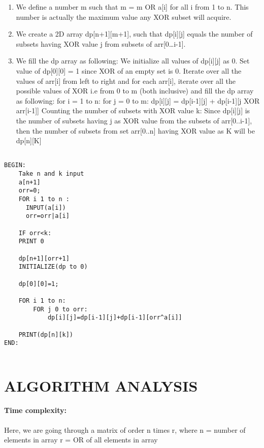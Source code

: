 \documentclass[10pt]{article}
\begin{document}
\begin{multicols*}{2}
\begin{enumerate}
\item	We define a number m such that m = m OR a[i] for all i from 1 to n. This number is actually the maximum value any XOR subset will acquire.

\item	 We create a 2D array dp[n+1][m+1], such that dp[i][j] equals the number of subsets having XOR value j from subsets of arr[0…i-1].

\item	We fill the dp array as following:
We initialize all values of dp[i][j] as 0.
Set value of dp[0][0] = 1 since XOR of an empty set is 0.
Iterate over all the values of arr[i] from left to right and for each arr[i], iterate over all the possible values of XOR i.e from 0 to m (both inclusive) and fill the dp array as following:
   	for i = 1 to n:
             for j = 0 to m:
                   dp[i][j] = dp[i­-1][j] + dp[i­-1][j XOR arr[i-1]]
Counting the number of subsets with XOR value k: Since dp[i][j] is the number of subsets having j as XOR value from the subsets of arr[0..i-1], then the number of subsets from set arr[0..n] having XOR value as K will be dp[n][K]


\end{enumerate}



\begin{lstlisting}
        
BEGIN:
	Take n and k input
	a[n+1]
	orr=0;
	FOR i 1 to n :
      INPUT(a[i])
      orr=orr|a[i]

	IF orr<k:
  	PRINT 0
  	
    dp[n+1][orr+1]
    INITIALIZE(dp to 0)
	
    dp[0][0]=1;
	
	FOR i 1 to n:
    	FOR j 0 to orr:
            dp[i][j]=dp[i-1][j]+dp[i-1][orr^a[i]]
           
    PRINT(dp[n][k])
END:


\end{lstlisting}
    

	
\section*{ALGORITHM ANALYSIS} 


\paragraph{Time complexity:} Here, we are going through a matrix of order n times r, where
	n = number of elements in array
r = OR of all elements in array 


\end{multicols*}
\end{document}
